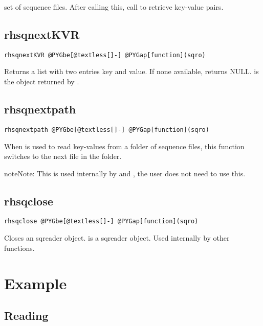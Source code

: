 \documentclass[letterpaper,10pt,english]{manual}
\begin{document}
set of sequence files. After calling this, call  to retrieve
key-value pairs.


\subsection{rhsqnextKVR}

\begin{Verbatim}[commandchars=@\[\]]
rhsqnextKVR @PYGbe[@textless[]-] @PYGap[function](sqro)
\end{Verbatim}

Returns a list with two entries key and value. If none available, returns
NULL.  is the object returned by .


\subsection{rhsqnextpath}

\begin{Verbatim}[commandchars=@\[\]]
rhsqnextpath @PYGbe[@textless[]-] @PYGap[function](sqro)
\end{Verbatim}

When  is used to read key-values from a folder of sequence files,
this function switches to the next file in the folder.

\begin{notice}{note}{Note:}
This is used internally by  and , the user does not need to use this.
\end{notice}


\subsection{rhsqclose}

\begin{Verbatim}[commandchars=@\[\]]
rhsqclose @PYGbe[@textless[]-] @PYGap[function](sqro)
\end{Verbatim}

Closes an sqreader object.  is a sqreader object. Used internally by
other functions.


\section{Example}


\subsection{Reading}
\end{document}
